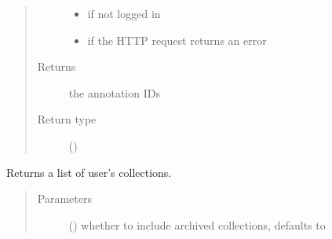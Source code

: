 \documentclass[letterpaper,10pt,english]{sphinxmanual}
\begin{document}
\begin{fulllineitems}
\begin{fulllineitems}
\begin{quote}
\begin{description}
\begin{itemize}
\item {} 
{\hyperref[\detokenize{autoapi/pine/client/exceptions/index:pine.client.exceptions.PineClientAuthException}]{}} \textendash{} if not logged in

\item {} 
{\hyperref[\detokenize{autoapi/pine/client/exceptions/index:pine.client.exceptions.PineClientHttpException}]{}} \textendash{} if the HTTP request returns an error

\end{itemize}

\item[{Returns}] \leavevmode
the annotation IDs

\item[{Return type}] \leavevmode
{}()

\end{description}\end{quote}

\end{fulllineitems}


\begin{fulllineitems}
\label{\detokenize{autoapi/pine/client/client/index:pine.client.client.PineClient.list_collections}}
Returns a list of user’s collections.
\begin{quote}\begin{description}
\item[{Parameters}] \leavevmode
{} () \textendash{} whether to include archived collections, defaults to 


\end{description}
\end{quote}
\end{fulllineitems}
\end{fulllineitems}
\end{document}
